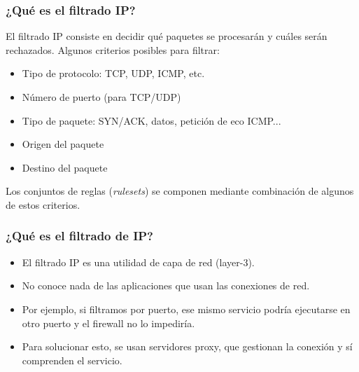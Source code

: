 \documentclass{beamer}
\begin{document}

\begin{frame}
\frametitle{¿Qué es el filtrado IP?}

El filtrado IP consiste en decidir qué paquetes se procesarán y cuáles serán rechazados. Algunos criterios posibles para filtrar:

\begin{itemize}
\item Tipo de protocolo: TCP, UDP, ICMP, etc.
\item Número de puerto (para TCP/UDP)
\item Tipo de paquete: SYN/ACK, datos, petición de eco ICMP...
\item Origen del paquete
\item Destino del paquete
\end{itemize}

Los conjuntos de reglas (\textit{rulesets}) se componen mediante combinación de algunos de estos criterios.

\end{frame}


\begin{frame}
\frametitle{¿Qué es el filtrado de IP?}

\begin{itemize}
\item El filtrado IP es una utilidad de capa de red (layer-3).
\item No conoce nada de las aplicaciones que usan las conexiones de red.
\item Por ejemplo, si filtramos por puerto, ese mismo servicio podría ejecutarse en otro puerto y el firewall no lo impediría.
\item Para solucionar esto, se usan \alert{servidores proxy}, que gestionan la conexión y sí comprenden el servicio.
\end{itemize}

\end{frame}

\end{document}
